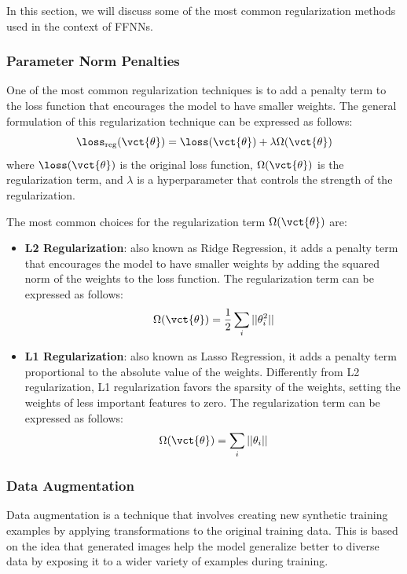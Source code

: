 In this section, we will discuss some of the most common regularization methods used in the context of FFNNs.

\subsubsection{Parameter Norm Penalties}
One of the most common regularization techniques is to add a penalty term to the loss function that encourages the model to have smaller weights.
The general formulation of this regularization technique can be expressed as follows:
\begin{equation*}
    \loss_{\text{reg}}(\vct{\theta}) = \loss(\vct{\theta}) + \lambda \Omega(\vct{\theta})
\end{equation*}
where $\loss(\vct{\theta})$ is the original loss function, $\Omega(\vct{\theta})$ is the regularization term, and $\lambda$
is a hyperparameter that controls the strength of the regularization.

The most common choices for the regularization term $\Omega(\vct{\theta})$ are:
\begin{itemize}
    \item \textbf{L2 Regularization}: also known as Ridge Regression, it adds a penalty term that encourages the model to have smaller weights 
    by adding the squared norm of the weights to the loss function. The regularization term can be expressed as follows:
    \begin{equation*}
        \Omega(\vct{\theta}) = \frac{1}{2} \sum_{i} ||\theta_i^2||
    \end{equation*}
    \item \textbf{L1 Regularization}: also known as Lasso Regression, it adds a penalty term proportional to the absolute value of the weights.
    Differently from L2 regularization, L1 regularization favors the sparsity of the weights, setting the weights of less important features to zero. 
    The regularization term can be expressed as follows:
    \begin{equation*}
        \Omega(\vct{\theta}) = \sum_{i} ||\theta_i||
    \end{equation*}
\end{itemize}

\subsubsection{Data Augmentation}
Data augmentation is a technique that involves creating new synthetic training examples by applying transformations to the original training data.
This is based on the idea that generated images help the model generalize better to diverse data by exposing it to a wider variety of examples during training.


